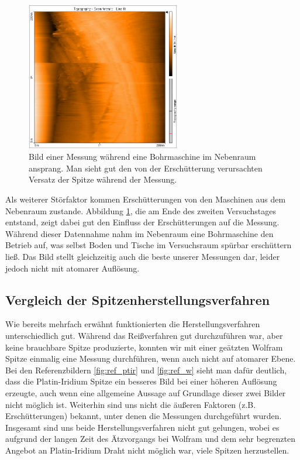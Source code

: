 \documentclass[10pt, a4paper]{article}
\begin{document}
\begin{figure}[h]
\centering
\includegraphics[width=0.6\textwidth]{./grafiken/bohrer.png}
\caption{Bild einer Messung während eine Bohrmaschine im Nebenraum ansprang. Man sieht gut den von der Erschütterung verursachten Versatz der Spitze während der Messung.}
\label{fig:bohrer}
\end{figure}

Als weiterer Störfaktor kommen Erschütterungen von den Maschinen aus dem Nebenraum zustande. Abbildung \ref{fig:bohrer}, die am Ende des zweiten Versuchstages entstand, zeigt dabei gut den Einfluss der Erschütterungen auf die Messung.
Während dieser Datennahme nahm im Nebenraum eine Bohrmaschine den Betrieb auf, was selbst Boden und Tische im Versuchsraum spürbar erschüttern ließ.
Das Bild stellt gleichzeitig auch die beste unserer Messungen dar, leider jedoch nicht mit atomarer Auflösung.

\subsection{Vergleich der Spitzenherstellungsverfahren}

Wie bereits mehrfach erwähnt funktionierten die Herstellungsverfahren unterschiedlich gut.
Während das Reißverfahren gut durchzuführen war, aber keine brauchbare Spitze produzierte, konnten wir mit einer geätzten Wolfram Spitze einmalig eine Messung durchführen, wenn auch nicht auf atomarer Ebene.
Bei den Referenzbildern \ref{fig:ref_ptir} und \ref{fig:ref_w} sieht man dafür deutlich, dass die Platin-Iridium Spitze ein besseres Bild bei einer höheren Auflösung erzeugte, auch wenn eine allgemeine Aussage auf Grundlage dieser zwei Bilder nicht möglich ist.
Weiterhin sind uns nicht die äußeren Faktoren (z.B. Erschütterungen) bekannt, unter denen die Messungen durchgeführt wurden.
Insgesamt sind uns beide Herstellungsverfahren nicht gut gelungen, wobei es aufgrund der langen Zeit des Ätzvorgangs bei Wolfram und dem sehr begrenzten Angebot an Platin-Iridium Draht nicht möglich war, viele Spitzen herzustellen.
\end{document}

